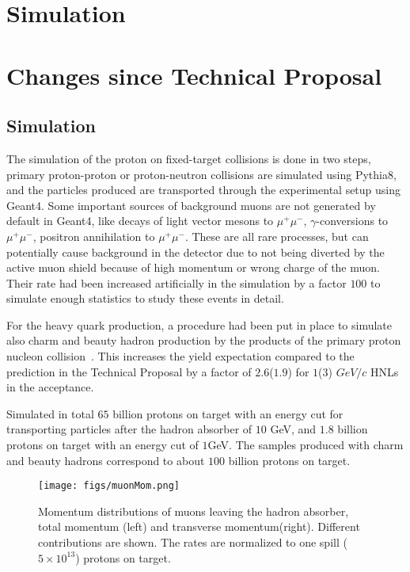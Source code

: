\section{Simulation}
\label{sec:simulation}


\section{Changes since Technical Proposal}
\subsection{Simulation}
\label{sec:simulation}
The simulation of the proton on fixed-target collisions is done in two steps, primary proton-proton or proton-neutron collisions are simulated using Pythia8, and the particles produced are transported through the experimental setup using Geant4. Some important sources of background muons are not generated by default in Geant4, like decays of light vector mesons to $\mu^+\mu^-$, $\gamma$-conversions to $\mu^+\mu^-$, positron annihilation to $\mu^+\mu^-$. These are all rare processes, but can potentially cause background in the detector due to not being diverted by the active muon shield because of high momentum or wrong charge of the muon. Their rate had been increased artificially in the simulation by a factor $100$ to simulate enough statistics to study these events in detail.


For the heavy quark production, a procedure had been put in place to simulate also charm and beauty hadron production by the products of the primary proton nucleon collision~\cite{cascade}. %
This increases the yield expectation compared to the prediction in the Technical Proposal by a factor of $2.6$($1.9$) for  $1$($3$) $GeV/c$ HNLs in the acceptance.

Simulated in total $65$ billion protons on target with an energy cut for transporting particles after the hadron absorber of $10$ GeV, and $1.8$ billion protons on target with an energy cut of $1$GeV. The samples produced with charm and beauty hadrons correspond to about $100$ billion protons on target.

\begin{figure}[h]
\centering
\texttt{[image: figs/muonMom.png]}
\caption{Momentum distributions of muons leaving the hadron absorber, total momentum (left) and transverse momentum(right). Different contributions are shown. The rates are normalized to one spill ($5\times 10^{13} $) protons on target.}
\label{fig:muonMom}
\end{figure}

